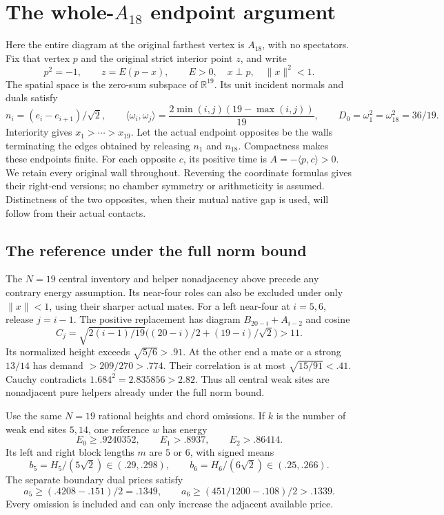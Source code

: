 \documentclass[11pt]{article}
\theoremstyle{definition}
\theoremstyle{remark}
\newcommand{\ip}[2]{\langle #1,#2\rangle}
\newcommand{\norm}[1]{\lVert #1\rVert}
\begin{document}
\section{The whole-\(A_{18}\) endpoint argument}
\label{app:wholeA18}
Here the entire diagram at the original farthest vertex is
\(A_{18}\), with no spectators. Fix that vertex \(p\) and the
original strict interior point \(z\), and write
\[
 p^2=-1,\qquad z=E(p-x),\qquad E>0,\quad x\perp p,
 \quad \norm{x}^2<1.
\]
The spatial space is the zero-sum subspace of \(\mathbb R^{19}\).
Its unit incident normals and duals satisfy
\[
 n_i=(e_i-e_{i+1})/\sqrt2,\qquad
 \ip{\omega_i}{\omega_j}
   =\frac{2\min(i,j)(19-\max(i,j))}{19},\qquad
 D_0=\omega_1^2=\omega_{18}^2=36/19.
\]
Interiority gives \(x_1>\cdots>x_{19}\).
Let the actual endpoint opposites be the walls terminating the
edges obtained by releasing \(n_1\) and \(n_{18}\).
Compactness makes these endpoints finite. For each opposite \(c\),
its positive time is \(A=-\ip p c>0\).
We retain every original wall throughout. Reversing the coordinate
formulas gives their right-end versions; no chamber symmetry or
arithmeticity is assumed. Distinctness of the two opposites, when
their mutual native gap is used, will follow from their actual contacts.

\subsection{The reference under the full norm bound}
The \(N=19\) central inventory and helper nonadjacency
above precede any contrary energy assumption.
Its near-four roles can also be excluded under
only \(\norm x<1\), using their sharper actual mates.
For a left near-four at \(i=5,6\), release \(j=i-1\).
The positive replacement has diagram
\(B_{20-i}+A_{i-2}\) and cosine
\[
 C_j=\sqrt{2(i-1)/19}
     \bigl((20-i)/2+(19-i)/\sqrt2\bigr)>11.
\]
Its normalized height exceeds \(\sqrt{5/6}>.91\).
At the other end a mate or a strong \(13/14\)
has demand \(>209/270>.774\).
Their correlation is at most
\(\sqrt{15/91}<.41\).
Cauchy contradicts \(1.684^2=2.835856>2.82\).
Thus all central weak sites are nonadjacent pure
helpers already under the full norm bound.

Use the same \(N=19\) rational heights and chord
omissions. If \(k\) is the number of weak end
sites \(5,14\), one reference \(w\) has energy
\[
 E_0\geq.9240352,\qquad E_1>.8937,\qquad E_2>.86414.
\]
Its left and right block lengths \(m\) are \(5\)
or \(6\), with signed means
\[
 b_5=H_5/(5\sqrt2)\in(.29,.298),\qquad
 b_6=H_6/(6\sqrt2)\in(.25,.266).
\]
The separate boundary dual prices satisfy
\[
 a_5\geq(.4208-.151)/2=.1349,\qquad
 a_6\geq(451/1200-.108)/2>.1339.
\]
Every omission is included and can only increase
the adjacent available price.
\end{document}
